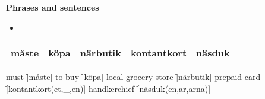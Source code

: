 
\begin{flushleft}
    \textbf{Phrases and sentences}
    \begin{itemize}
        \item 
    \end{itemize}
\end{flushleft}

\begin{center}
    \begin{tabular}{|c c c c c c|}
        \hline
        måste & köpa & närbutik & kontantkort & näsduk &  \\
        \hline
    \end{tabular}
\end{center}

\begin{questions}
    \begin{multicols}{2}
        \raggedcolumns
        \question must \f[måste]
        \question to buy \f[köpa]
        \question local grocery store \f[närbutik]
        \question prepaid card \f[kontantkort(et,\_,en)]
        \question handkerchief \f[näsduk(en,ar,arna)]
    \end{multicols}
\end{questions}
